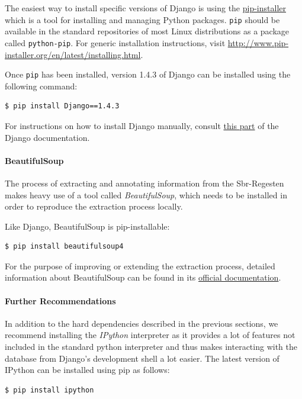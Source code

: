 The easiest way to install specific versions of Django is using the
\href{http://www.pip-installer.org/en/latest/}{pip-installer} which is
a tool for installing and managing Python packages. \texttt{pip}
should be available in the standard repositories of most Linux
distributions as a package called \texttt{python-pip}. For generic
installation instructions, visit
\url{http://www.pip-installer.org/en/latest/installing.html}.

Once \texttt{pip} has been installed, version 1.4.3 of Django can be
installed using the following command:

\begin{verbatim}
$ pip install Django==1.4.3
\end{verbatim}

For instructions on how to install Django manually, consult
\href{https://www.djangoproject.com/download/}{this part} of the
Django documentation.

\paragraph{BeautifulSoup}
The process of extracting and annotating information from the
Sbr-Regesten makes heavy use of a tool called \emph{BeautifulSoup},
which needs to be installed in order to reproduce the extraction
process locally.

Like Django, BeautifulSoup is pip-installable:

\begin{verbatim}
$ pip install beautifulsoup4
\end{verbatim}

For the purpose of improving or extending the extraction process,
detailed information about BeautifulSoup can be found in its
\href{http://www.crummy.com/software/BeautifulSoup/bs4/doc/}{official documentation}.

\paragraph{Further Recommendations}
In addition to the hard dependencies described in the previous
sections, we recommend installing the \emph{IPython} interpreter as it
provides a lot of features not included in the standard python
interpreter and thus makes interacting with the database from Django's
development shell a lot easier. The latest version of IPython can be
installed using pip as follows:

\begin{verbatim}
$ pip install ipython
\end{verbatim}

